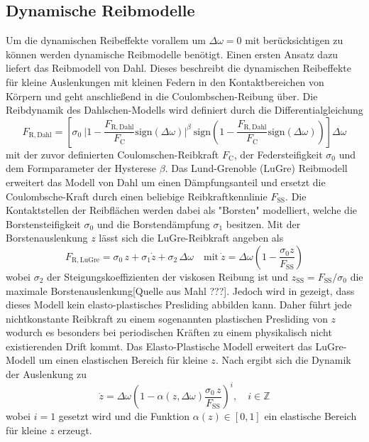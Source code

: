 \subsection{Dynamische Reibmodelle}
Um die dynamischen Reibeffekte vorallem um $\Delta\omega=0$ mit berücksichtigen zu können werden dynamische Reibmodelle benötigt. Einen ersten Ansatz dazu liefert das Reibmodell von Dahl. Dieses beschreibt die dynamischen Reibeffekte für kleine Auslenkungen mit kleinen Federn in den Kontaktbereichen von Körpern und geht anschließend in die Coulombschen-Reibung über\cite{Schroeder.2015}. Die Reibdynamik des Dahlschen-Modells wird definiert durch die Differentialgleichung
\begin{equation}
F_\mathrm{R,Dahl} = \left[\sigma_0\ \vert 1-\frac{F_\mathrm{R,Dahl}}{F_\mathrm{C}}\mathrm{sign}(\Delta\omega)\vert^\beta\ \mathrm{sign}\left( 1-\frac{F_\mathrm{R,Dahl}}{F_\mathrm{C}}\mathrm{sign}(\Delta\omega)\right)\right]\Delta\omega
\end{equation}
mit der zuvor definierten Coulomschen-Reibkraft $F_\mathrm{C}$, der Federsteifigkeit $\sigma_0$ und dem Formparameter der Hysterese $\beta$. Das Lund-Grenoble (LuGre) Reibmodell erweitert das Modell von Dahl um einen Dämpfungsanteil und ersetzt die Coulombsche-Kraft durch einen beliebige Reibkraftkennlinie $F_\mathrm{SS}$. Die Kontaktstellen der Reibflächen werden dabei als "Borsten"  modelliert, welche die Borstensteifigkeit $\sigma_0$ und die Borstendämpfung $\sigma_1$ besitzen. Mit der Borstenauslenkung $z$ lässt sich die LuGre-Reibkraft angeben als
\begin{equation}
F_\mathrm{R,LuGre} = \sigma_0\, z + \sigma_1 \dot{z} + \sigma_2\, \Delta \omega\quad \mathrm{mit}\  \dot{z}=\Delta\omega\left(1-\frac{\sigma_0 z}{F_\mathrm{SS}}\right)
\end{equation} 
wobei $\sigma_2$ der Steigungskoeffizienten der viskosen Reibung ist und $z_\mathrm{SS} = F_\mathrm{SS}/\sigma_0$ die maximale Borstenauslenkung[Quelle aus Mahl ???]. Jedoch wird in \cite{Dupont.2002} gezeigt, dass dieses Modell kein elasto-plastisches Presliding abbilden kann. Daher führt jede nichtkonstante Reibkraft zu einem sogenannten plastischen Presliding von $z$ wodurch es besonders bei periodischen Kräften zu einem physikalisch nicht existierenden Drift kommt. Das Elasto-Plastische Modell erweitert das LuGre-Modell um einen elastischen Bereich für kleine $z$. Nach \cite{Dupont.2000} ergibt sich die Dynamik der Auslenkung zu 
\begin{equation}
\dot{z} = \Delta \omega \left(1-\alpha(z,\Delta \omega)\frac{\sigma_0\,z}{F_\mathrm{SS}}\right)^i,\quad i\in \mathbb{Z}
\end{equation}
wobei $i=1$ gesetzt wird und die Funktion $\alpha(z)\in\left[0,1\right]$ ein elastische Bereich für kleine $z$ erzeugt. 

